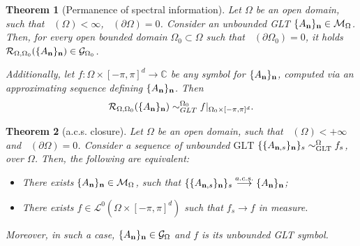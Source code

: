 \documentclass[10pt,a4paper]{amsart}
\newtheorem{thm}{Theorem}
\DeclareMathOperator{\Ld}{\mathcal{L}^d}
\begin{document}
\begin{thm}[Permanence of spectral information]\label{perm_spectr_info}
    Let $\Omega$ be an open domain, such that $\Ld(\Omega)<\infty$, $\Ld(\partial\Omega)=0$. Consider an unbounded GLT $\{A_\mathbf n\}_\mathbf n\in\mathcal{M}_\Omega$. Then, for every open bounded domain $\Omega_0\subset\Omega$ such that $\Ld(\partial\Omega_0)=0$, it holds $\mathcal{R}_{\Omega,\Omega_0}(\{A_\mathbf n\}_\mathbf n)\in\mathcal{G}_{\Omega_0}$.
    
    Additionally, let $f:\Omega\times[-\pi,\pi]^d\to\mathbb{C}$ be any symbol for $\{A_\mathbf n\}_\mathbf n$, computed via an approximating sequence defining $\{A_\mathbf n\}_\mathbf n$. Then
    \begin{equation*}
        \mathcal{R}_{\Omega,\Omega_0}(\{A_\mathbf n\}_\mathbf n)\sim_{GLT}^{\Omega_0}f|_{\Omega_0\times[-\pi,\pi]^d}.
    \end{equation*}
\end{thm}

\begin{thm}[a.c.s. closure]\label{thm_acs_closure}
    Let $\Omega$ be an open domain, such that $\Ld(\Omega)<+\infty$ and $\Ld(\partial\Omega)=0$. Consider a sequence of unbounded $\mathrm{GLT}$ $\{\{A_{\mathbf n,s}\}_\mathbf n\}_s\sim_{\mathrm{GLT}}^{\Omega}f_s$, over $\Omega$. Then, the following are equivalent:
    \begin{itemize}
        \item[(i)]\label{thm_acs_closure_item_i} There exists $\{A_\mathbf n\}_\mathbf n\in\mathcal{M}_\Omega$, such that $\{\{A_{\mathbf n,s}\}_\mathbf n\}_s\overset{a.c.s.}{\longrightarrow}\{A_\mathbf n\}_\mathbf n$; 
        \item[(ii)]\label{thm_acs_closure_item_ii} There exists $f\in\mathcal{L}^0(\Omega\times[-\pi,\pi]^d)$ such that $f_s\to f$ in measure.
    \end{itemize}
    Moreover, in such a case, $\{A_\mathbf n\}_\mathbf n\in\mathcal{G}_\Omega$ and $f$ is its unbounded GLT symbol.
\end{thm}
\end{document}
